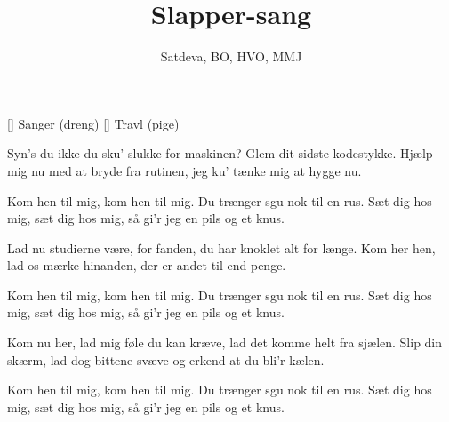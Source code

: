 \documentclass[a4paper,11pt]{article}
\title{Slapper-sang}
\author{Satdeva, BO, HVO, MMJ}
\begin{document}
\maketitle

\begin{roles}
    [] Sanger (dreng)
    [] Travl (pige)
\end{roles}

\begin{song}

   Syn's du ikke du sku' slukke for maskinen?
            Glem dit sidste kodestykke.
            Hjælp mig nu med at bryde fra rutinen,
            jeg ku' tænke mig at hygge nu.

   Kom hen til mig,
            kom hen til mig.
            Du trænger sgu nok til en rus.
            Sæt dig hos mig,
            sæt dig hos mig,
            så gi'r jeg en pils og et knus.

   Lad nu studierne være, for fanden,
            du har knoklet alt for længe.
            Kom her hen, lad os mærke hinanden,
            der er andet til end penge.

   Kom hen til mig,
            kom hen til mig.
            Du trænger sgu nok til en rus.
            Sæt dig hos mig,
            sæt dig hos mig,
            så gi'r jeg en pils og et knus.

   Kom nu her, lad mig føle du kan kræve,
            lad det komme helt fra sjælen.
            Slip din skærm, lad dog bittene svæve
            og erkend at du bli'r kælen.

   Kom hen til mig,
            kom hen til mig.
            Du trænger sgu nok til en rus.
            Sæt dig hos mig,
            sæt dig hos mig,
            så gi'r jeg en pils og et knus.
\end{song}
\end{document}
